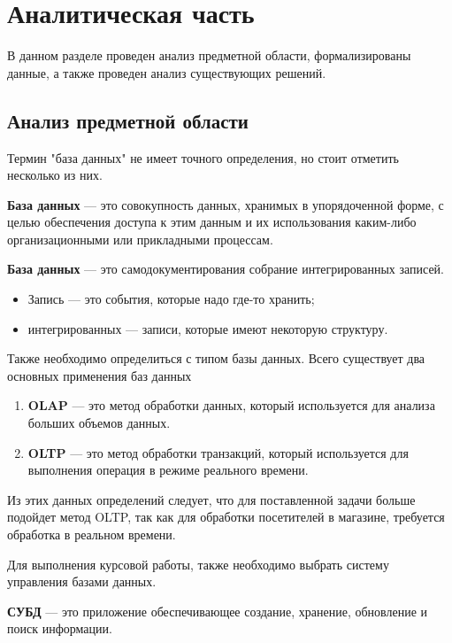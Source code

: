 \section{Аналитическая часть}

В данном разделе проведен анализ предметной области, формализированы данные,
а также проведен анализ существующих решений.

\subsection{Анализ предметной области}

Термин "база данных" не имеет точного определения, но стоит отметить несколько из них.


\textbf{База данных} \cite{bd-1} --- это совокупность данных, хранимых в упорядоченной форме, с целью
обеспечения доступа к этим данным и их использования каким-либо организационными
или прикладными процессам.

\textbf{База данных} --- это самодокументирования собрание интегрированных записей.

\begin{itemize}
    \item Запись --- это события, которые надо где-то хранить;
    \item интегрированных --- записи, которые имеют некоторую структуру.
\end{itemize}

Также необходимо определиться с типом базы данных. 
Всего существует два основных применения баз данных

\begin{enumerate}[label=\arabic*.]
    \item \textbf{OLAP} \cite{OLAP} --- это метод обработки данных, который используется для анализа
                    больших объемов данных.
    \item \textbf{OLTP} \cite{OLTP} --- это метод обработки транзакций, который используется для
                    выполнения операция в режиме реального времени.
\end{enumerate}

Из этих данных определений следует, что для поставленной задачи больше подойдет метод
OLTP, так как для обработки посетителей в магазине, требуется обработка в реальном времени.

Для выполнения курсовой работы, также необходимо выбрать систему управления базами данных.

\textbf{СУБД} --- это приложение обеспечивающее создание, хранение, обновление и поиск информации.

